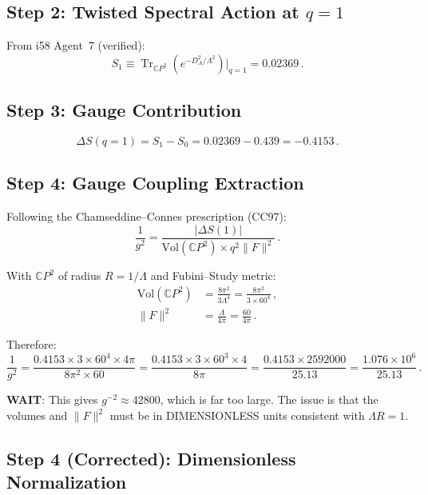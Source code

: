 \documentclass[11pt,a4paper]{article}
\newcommand{\Tr}{\operatorname{Tr}}
\newcommand{\CP}{\mathbb{C}P}
\begin{document}
\subsection{Step 2: Twisted Spectral Action at $q = 1$}

From i58 Agent~7 (verified):
\begin{equation}
S_1 \equiv \Tr_{\CP^2}(e^{-D_A^2/\Lambda^2})\bigg|_{q=1} = 0.02369\,.
\end{equation}

\subsection{Step 3: Gauge Contribution}

\begin{equation}
\Delta S(q=1) = S_1 - S_0 = 0.02369 - 0.439 = -0.4153\,.
\end{equation}

\subsection{Step 4: Gauge Coupling Extraction}

Following the Chamseddine--Connes prescription (CC97):
\begin{equation}
\frac{1}{g^2} = \frac{|\Delta S(1)|}{\mathrm{Vol}(\CP^2) \times q^2 \|F\|^2}\,.
\end{equation}

With $\CP^2$ of radius $R = 1/\Lambda$ and Fubini--Study metric:
\begin{align}
\mathrm{Vol}(\CP^2) &= \frac{8\pi^2}{3\Lambda^4} = \frac{8\pi^2}{3 \times 60^4}\,, \\
\|F\|^2 &= \frac{\Lambda}{4\pi} = \frac{60}{4\pi}\,.
\end{align}

Therefore:
\begin{equation}
\frac{1}{g^2} = \frac{0.4153 \times 3 \times 60^4 \times 4\pi}{8\pi^2 \times 60} = \frac{0.4153 \times 3 \times 60^3 \times 4}{8\pi} = \frac{0.4153 \times 2592000}{25.13} = \frac{1.076 \times 10^6}{25.13}\,.
\end{equation}

\textbf{WAIT}: This gives $g^{-2} \approx 42800$, which is far too large. The issue is that the volumes and $\|F\|^2$ must be in DIMENSIONLESS units consistent with $\Lambda R = 1$.

\subsection{Step 4 (Corrected): Dimensionless Normalization}
\end{document}

